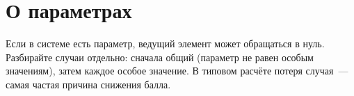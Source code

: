 \documentclass[12pt, a4paper]{article}
\begin{document}
\section*{О параметрах}

Если в системе есть параметр, ведущий элемент может обращаться в нуль.
Разбирайте случаи отдельно: сначала общий (параметр не равен особым значениям),
затем каждое особое значение. В типовом расчёте потеря случая~--- самая частая
причина снижения балла.
\end{document}
